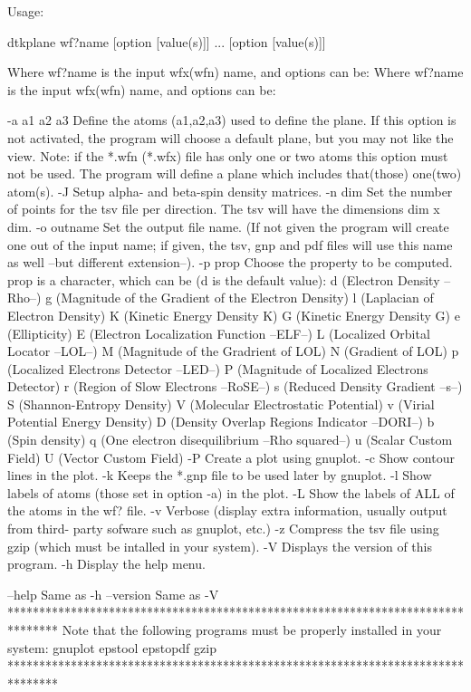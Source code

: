 Usage:

	dtkplane wf?name [option [value(s)]] ... [option [value(s)]]

Where wf?name is the input wfx(wfn) name, and options can be:
Where wf?name is the input wfx(wfn) name, and options can be:

  -a a1 a2 a3	Define the atoms  (a1,a2,a3) used to define the plane.
            	  If this option is not activated, the program will 
            	  choose a default plane, but you may not like the view.
            	  Note: if the *.wfn (*.wfx) file has only one or two atoms
            	  this option must not be used. The program will define
            	  a plane which includes that(those) one(two) atom(s).
  -J        	Setup alpha- and beta-spin density matrices.
  -n  dim   	Set the number of points for the tsv file per direction.
            	  The tsv will have the dimensions dim x dim.
  -o outname	Set the output file name.
            	  (If not given the program will create one out of
            	  the input name; if given, the tsv, gnp and pdf files will
            	  use this name as well --but different extension--).
  -p prop	Choose the property to be computed. prop is a character,
         	  which can be (d is the default value): 
         		d (Electron Density --Rho--)
         		g (Magnitude of the Gradient of the Electron Density)
         		l (Laplacian of Electron Density)
         		K (Kinetic Energy Density K)
         		G (Kinetic Energy Density G)
         		e (Ellipticity)
         		E (Electron Localization Function --ELF--)
         		L (Localized Orbital Locator --LOL--)
         		M (Magnitude of the Gradrient of LOL)
         		N (Gradient of LOL)
         		p (Localized Electrons Detector --LED--)
         		P (Magnitude of Localized Electrons Detector)
         		r (Region of Slow Electrons --RoSE--)
         		s (Reduced Density Gradient --s--)
         		S (Shannon-Entropy Density)
         		V (Molecular Electrostatic Potential)
         		v (Virial Potential Energy Density)
         		D (Density Overlap Regions Indicator --DORI--)
         		b (Spin density)
         		q (One electron disequilibrium --Rho squared--)
         		u (Scalar Custom Field)
         		U (Vector Custom Field)
  -P     	Create a plot using gnuplot.
  -c     	Show contour lines in the plot.
  -k     	Keeps the *.gnp file to be used later by gnuplot.
  -l     	Show labels of atoms (those set in option -a) in the plot.
  -L     	Show the labels of ALL of the atoms in the wf? file.
  -v     	Verbose (display extra information, usually output from third-
         	  party sofware such as gnuplot, etc.)
  -z     	Compress the tsv file using gzip (which must be intalled
         	   in your system).
  -V        	Displays the version of this program.
  -h     	Display the help menu.

  --help    		Same as -h
  --version 		Same as -V
********************************************************************************
  Note that the following programs must be properly installed in your system:
                                    gnuplot
                                    epstool
                                    epstopdf
                                      gzip
********************************************************************************
